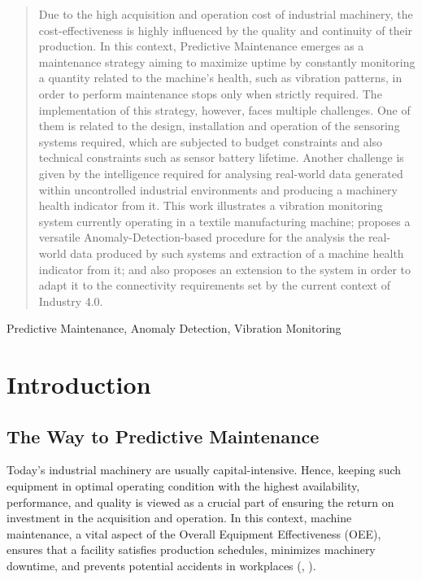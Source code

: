 \documentclass[conference]{IEEEtran}
\begin{document}
\begin{abstract}
Due to the high acquisition and operation cost of industrial machinery, the cost-effectiveness is highly influenced by the quality and continuity of their production. In this context, Predictive Maintenance emerges as a maintenance strategy aiming to maximize uptime by constantly monitoring a quantity related to the machine's health, such as vibration patterns, in order to perform maintenance stops only when strictly required. The implementation of this strategy, however, faces multiple challenges. One of them is related to the design, installation and operation of the sensoring systems required, which are subjected to budget constraints and also technical constraints such as sensor battery lifetime. Another challenge is given by the intelligence required for analysing real-world data generated within uncontrolled industrial environments and producing a machinery health indicator from it. This work illustrates a vibration monitoring system currently operating in a textile manufacturing machine; proposes a versatile Anomaly-Detection-based procedure for the analysis the real-world data produced by such systems and extraction of a machine health indicator from it; and also proposes an extension to the system in order to adapt it to the connectivity requirements set by the current context of Industry 4.0.
\end{abstract}



\begin{IEEEkeywords}
Predictive Maintenance, Anomaly Detection, Vibration Monitoring
\end{IEEEkeywords}

\section{Introduction}

\subsection{The Way to Predictive Maintenance}

Today’s industrial machinery are usually capital-intensive. Hence, keeping such equipment in optimal operating condition with the highest availability, performance, and quality is viewed as a crucial part of ensuring the return on investment in the acquisition and operation. In this context, machine maintenance, a vital aspect of the Overall Equipment Effectiveness (OEE), ensures that a facility satisfies production schedules, minimizes machinery downtime, and prevents potential accidents in workplaces (\cite{chong2015}, \cite{b1}). 
\end{document}
